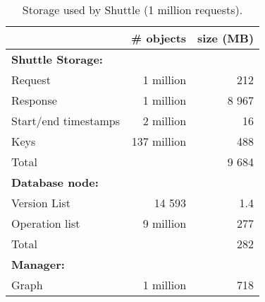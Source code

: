 \begin{table}[h]
\centering
\footnotesize
  \begin{tabular}{l|rr}
                & \# objects & size (MB) \\ \hline
  \textbf{Shuttle Storage: }      \\
  Request         & 1 million    & 212       \\  %
  Response        & 1 million    & 8 967     \\  %
  Start/end timestamps      & 2 million    & 16        \\  %
  Keys            & 137 million  & 488       \\  %
  Total           &              & 9 684     \\  %
  \textbf{Database node:}        &           \\
  Version List    &  14 593      &  1.4       \\ %
  Operation list  &  9 million   &  277       \\ %
  Total           &              & 282 \\ %
  \textbf{Manager:} & & \\ 
  Graph           & 1 million    & 718 \\  %
  \end{tabular}            
\caption{Storage used by Shuttle  (1 million requests).}
\label{tab:storage_overhead}
\vspace{-5mm}
\end{table}

